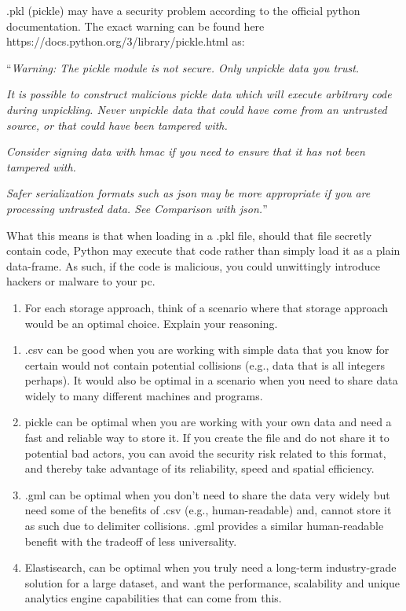\documentclass[11pt]{article}
\providecommand{\tightlist}{%
      \setlength{\itemsep}{0pt}\setlength{\parskip}{0pt}}
\begin{document}
    .pkl (pickle) may have a security problem according to the official
python documentation. The exact warning can be found here
https://docs.python.org/3/library/pickle.html as:

``\emph{Warning: The pickle module is not secure. Only unpickle data you
trust.}

\emph{It is possible to construct malicious pickle data which will
execute arbitrary code during unpickling. Never unpickle data that could
have come from an untrusted source, or that could have been tampered
with.}

\emph{Consider signing data with hmac if you need to ensure that it has
not been tampered with.}

\emph{Safer serialization formats such as json may be more appropriate
if you are processing untrusted data. See Comparison with json.}''

What this means is that when loading in a .pkl file, should that file
secretly contain code, Python may execute that code rather than simply
load it as a plain data-frame. As such, if the code is malicious, you
could unwittingly introduce hackers or malware to your pc.

    \begin{enumerate}
\def\labelenumi{(\alph{enumi})}
\setcounter{enumi}{3}
\tightlist
\item
  For each storage approach, think of a scenario where that storage
  approach would be an optimal choice. Explain your reasoning.
\end{enumerate}

    \begin{enumerate}
\def\labelenumi{\arabic{enumi}.}
\tightlist
\item
  .csv can be good when you are working with simple data that you know
  for certain would not contain potential collisions (e.g., data that is
  all integers perhaps). It would also be optimal in a scenario when you
  need to share data widely to many different machines and programs.
\item
  pickle can be optimal when you are working with your own data and need
  a fast and reliable way to store it. If you create the file and do not
  share it to potential bad actors, you can avoid the security risk
  related to this format, and thereby take advantage of its reliability,
  speed and spatial efficiency.
\item
  .gml can be optimal when you don't need to share the data very widely
  but need some of the benefits of .csv (e.g., human-readable) and,
  cannot store it as such due to delimiter collisions. .gml provides a
  similar human-readable benefit with the tradeoff of less universality.
\item
  Elastisearch, can be optimal when you truly need a long-term
  industry-grade solution for a large dataset, and want the performance,
  scalability and unique analytics engine capabilities that can come
  from this.
\end{enumerate}
\end{document}
